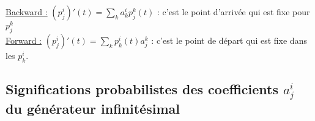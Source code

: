 \underline{Backward :} $(p_j^i)'(t)=\sum_k a_k^ip_j^k(t)$ : c'est le point d'arrivée qui est fixe pour $p_j^k$\\
\underline{Forward :} $(p_j^i)'(t)=\sum_k p_k^i(t)a_j^k$ : c'est le point de départ qui est fixe dans les $p_k^i$.

\subsection{Significations probabilistes des coefficients $a_j^i$ du générateur infinitésimal}
